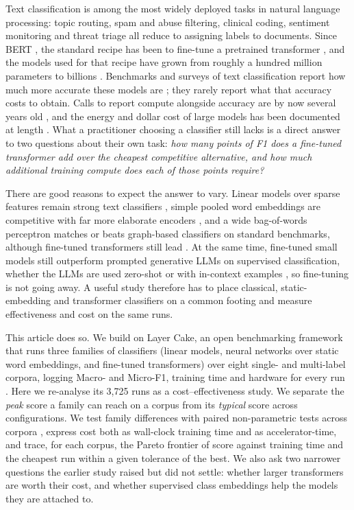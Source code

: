 \documentclass{ijis}
\begin{document}
Text classification is among the most widely deployed tasks in natural language processing: topic routing, spam and abuse filtering, clinical coding, sentiment monitoring and threat triage all reduce to assigning labels to documents. Since BERT \cite{devlin-etal-2019-bert}, the standard recipe has been to fine-tune a pretrained transformer \cite{vaswani,howard2018universal,sun2019fine}, and the models used for that recipe have grown from roughly a hundred million parameters to billions \cite{grattafiori2024llama3,guo2025deepseek}. Benchmarks and surveys of text classification report how much more accurate these models are \cite{minaee2021deep,li2022survey,kowsari2019text}; they rarely report what that accuracy costs to obtain. Calls to report compute alongside accuracy are by now several years old \cite{strubell2019energy,schwartz2020green,dodge2019show,henderson2020towards}, and the energy and dollar cost of large models has been documented at length \cite{patterson2021carbon,luccioni2024power}. What a practitioner choosing a classifier still lacks is a direct answer to two questions about their own task: \emph{how many points of F1 does a fine-tuned transformer add over the cheapest competitive alternative, and how much additional training compute does each of those points require?}

There are good reasons to expect the answer to vary. Linear models over sparse features remain strong text classifiers \cite{joachims1998text,wang2012baselines,joulin-etal-2017-bag}, simple pooled word embeddings are competitive with far more elaborate encoders \cite{shen2018baseline}, and a wide bag-of-words perceptron matches or beats graph-based classifiers on standard benchmarks, although fine-tuned transformers still lead \cite{galke2022bag}. At the same time, fine-tuned small models still outperform prompted generative LLMs on supervised classification, whether the LLMs are used zero-shot or with in-context examples \cite{bucher2024fine,edwards2024language}, so fine-tuning is not going away. A useful study therefore has to place classical, static-embedding and transformer classifiers on a common footing and measure effectiveness and cost on the same runs.

This article does so. We build on Layer Cake, an open benchmarking framework that runs three families of classifiers (linear models, neural networks over static word embeddings, and fine-tuned transformers) over eight single- and multi-label corpora, logging Macro- and Micro-F1, training time and hardware for every run \cite{worth2025layercake}. Here we re-analyse its 3,725 runs as a cost--effectiveness study. We separate the \emph{peak} score a family can reach on a corpus from its \emph{typical} score across configurations. We test family differences with paired non-parametric tests across corpora \cite{demsar2006statistical}, express cost both as wall-clock training time and as accelerator-time, and trace, for each corpus, the Pareto frontier of score against training time and the cheapest run within a given tolerance of the best. We also ask two narrower questions the earlier study raised but did not settle: whether larger transformers are worth their cost, and whether supervised class embeddings help the models they are attached to.
\end{document}
